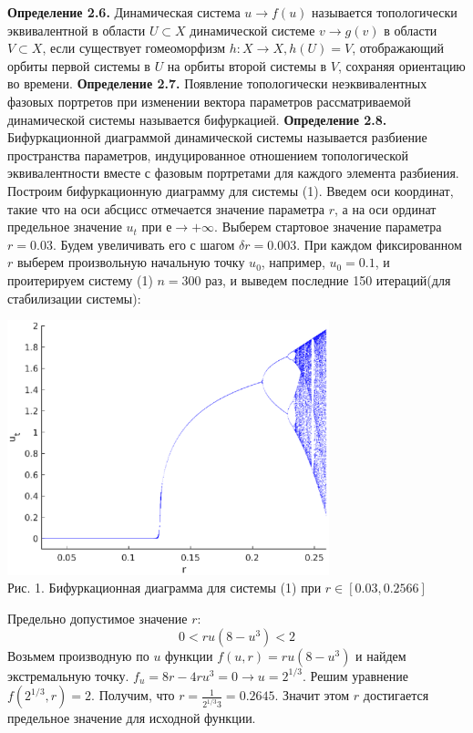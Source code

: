 \documentclass[11pt]{article}
\begin{document}
	\newline
	{\textbf{Определение 2.6.} Динамическая система $u \rightarrow f(u)$ называется топологически эквивалентной в области $U \subset X$ динамической системе $v \rightarrow g(v)$ в области $V \subset X$, если существует гомеоморфизм $h: X \rightarrow X, h(U) = V$, отображающий орбиты первой системы в $U$ на орбиты второй системы в $V$, сохраняя ориентацию во времени.}
	\newline
	{\textbf{Определение 2.7.} Появление топологически неэквивалентных фазовых портретов при изменении вектора параметров рассматриваемой динамической системы называется бифуркацией.}
	\newline
	{\textbf{Определение 2.8.} Бифуркационной диаграммой динамической системы называется разбиение пространства параметров, индуцированное отношением топологической эквивалентности вместе с фазовым портретами для каждого элемента разбиения.}
	\newline
	{Построим бифуркационную диаграмму для системы (1). Введем оси координат, такие что на оси абсцисс отмечается значение параметра $r$, а на оси ординат предельное значение $u_t$ при $е \rightarrow +\infty$. Выберем стартовое значение параметра $r = 0.03 $. Будем увеличивать его с шагом $\delta r = 0.003 $. При каждом фиксированном $r$ выберем произвольную начальную точку $u_0$, например, $u_0 = 0.1$, и проитерируем систему (1) $n = 300$ раз, и выведем последние 150 итераций(для стабилизации системы): }
	\begin{center}
		\includegraphics[width=0.7\textwidth]{bifur.eps}\\
		{Рис. 1. Бифуркационная диаграмма для системы (1) при $r \in [0.03, 0.2566]$}
	\end{center}
	{Предельно допустимое значение $r$:}
	\[0 < ru(8 - u^3) < 2\]
	{Возьмем производную по $u$ функции $f(u,r) = ru(8 - u^3)$ и найдем экстремальную точку. $f_u = 8r - 4ru^3 = 0 \rightarrow u = 2^{1/3}$. Решим уравнение $f(2^{1/3},r) = 2.$ Получим, что $r = \frac{1}{2^{1/3}3} = 0.2645.$ Значит этом $r$ достигается предельное значение для исходной функции.}
\end{document}
